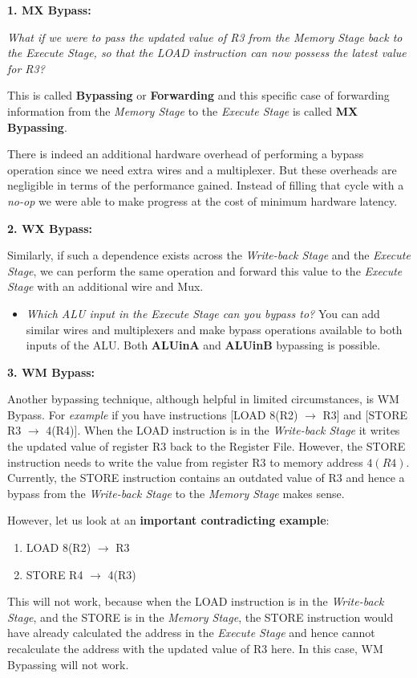 \documentclass[12pt]{article}
\newenvironment{QandA}{\begin{enumerate}[label=\bfseries\alph*.]\bfseries}
                      {\end{enumerate}}
\newenvironment{answered}{\par\quad\normalfont}{}
\begin{document}
\begin{QandA}
\begin{answered}
    \textbf{1. MX Bypass:}
    
    \textit{What if we were to pass the updated value of R3 from the Memory Stage back to the Execute Stage, so that the LOAD instruction can now possess the latest value for R3?}
    
    This is called \textbf{Bypassing} or \textbf{Forwarding} and this specific case of forwarding information from the \textit{Memory Stage} to the \textit{Execute Stage} is called \textbf{MX Bypassing}.
    
    There is indeed an additional hardware overhead of performing a bypass operation since we need extra wires and a multiplexer. But these overheads are negligible in terms of the performance gained. Instead of filling that cycle with a \textit{no-op} we were able to make progress at the cost of minimum hardware latency. 
    
    \textbf{2. WX Bypass:}
    
    Similarly, if such a dependence exists across the \textit{Write-back Stage} and the \textit{Execute Stage}, we can perform the same operation and forward this value to the \textit{Execute Stage} with an additional wire and Mux. 
    
    \begin{itemize}
        \item \textit{Which ALU input in the Execute Stage can you bypass to?} You can add similar wires and multiplexers and make bypass operations available to both inputs of the ALU. Both \textbf{ALUinA} and \textbf{ALUinB} bypassing is possible. 
    \end{itemize}
    
    \textbf{3. WM Bypass:}
    
    Another bypassing technique, although helpful in limited circumstances, is WM Bypass. For \textit{example} if you have instructions [LOAD 8(R2) $\rightarrow$ R3] and [STORE R3 $\rightarrow$ 4(R4)]. When the LOAD instruction is in the \textit{Write-back Stage} it writes the updated value of register R3 back to the Register File. However, the STORE instruction needs to write the value from register R3 to memory address $4(R4)$. Currently, the STORE instruction contains an outdated value of R3 and hence a bypass from the \textit{Write-back Stage} to the \textit{Memory Stage} makes sense.
    
    However, let us look at an \textbf{important contradicting example}:
    \begin{enumerate}
        \item LOAD 8(R2) $\rightarrow$ R3
        \item STORE R4 $\rightarrow$ 4(R3)
    \end{enumerate}
    This will not work, because when the LOAD instruction is in the \textit{Write-back Stage}, and the STORE is in the \textit{Memory Stage}, the STORE instruction would have already calculated the address in the \textit{Execute Stage} and hence cannot recalculate the address with the updated value of R3 here. In this case, WM Bypassing will not work.
    \end{answered}
    

\end{QandA}
\end{document}
